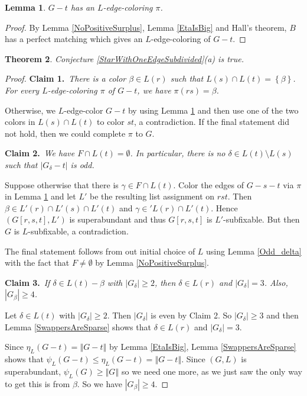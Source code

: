 \documentclass[12pt]{article}
\theoremstyle{plain}
\newtheorem{thm}{Theorem}[section]
\newtheorem{lem}[thm]{Lemma}
\theoremstyle{definition}
\theoremstyle{remark}
\newcommand{\set}[1]{\left\{ #1 \right\}}
\newcommand{\size}[1]{\left\Vert#1\right\Vert}
\newcommand{\claim}[2]{{\bf Claim #1.}~{\it #2}~~}
\begin{document}
	
	\begin{lem}\label{CanColorG-t}
		$G-t$ has an $L$-edge-coloring $\pi$.
	\end{lem}
	\begin{proof}
		By Lemma \ref{NoPositiveSurplus}, Lemma \ref{EtaIsBig} and Hall's theorem, $B$ has a perfect matching which gives an $L$-edge-coloring of $G-t$.
	\end{proof}

	\begin{thm}
		Conjecture \ref{StarWithOneEdgeSubdivided}(a) is true.
	\end{thm}
	\begin{proof}
	
		\claim{1}{There is a color $\beta \in L(r)$ such that $L(s) \cap L(t) = \set{\beta}$.  For every $L$-edge-coloring $\pi$ of $G-t$, we have $\pi(rs) = \beta$.}
		
		Otherwise, we $L$-edge-color $G-t$ by using Lemma \ref{CanColorG-t} and then use one of the two colors in $L(s) \cap L(t)$ to color $st$, a contradiction.  If the final statement did not hold, then we could complete $\pi$ to $G$.
		
		\claim{2}{We have $F \cap L(t) = \emptyset$.  In particular, there is no $\delta \in L(t) \setminus L(s)$ such that $|G_\delta - t|$ is odd.}
		
		Suppose otherwise that there is $\gamma \in F \cap L(t)$.  Color the edges of $G - s - t$ via $\pi$ in Lemma \ref{CanColorG-t} and let $L'$ be the resulting list assignment on $rst$.  Then $\beta \in L'(r) \cap L'(s) \cap L'(t)$ and $\gamma \in 'L(r) \cap L'(t)$.  Hence $(G[r,s,t], L')$ is superabundant and thus $G[r,s,t]$ is $L'$-subfixable.  But then $G$ is $L$-subfixable, a contradiction.
		
		The final statement follows from out initial choice of $L$ using Lemma \ref{Odd_delta} with the fact that $F \ne \emptyset$ by Lemma \ref{NoPositiveSurplus}.
		
		\claim{3}{If $\delta \in L(t) - \beta$ with $|G_\delta| \ge 2$, then $\delta \in L(r)$ and $|G_\delta| = 3$.  Also, $|G_\beta| \ge 4$.}
		
		Let $\delta \in L(t)$ with $|G_\delta| \ge 2$.  Then $|G_\delta|$ is even by Claim 2.  So $|G_\delta| \ge 3$ and then Lemma \ref{SwappersAreSparse} shows that $\delta \in L(r)$ and $|G_\delta| = 3$.  
		
		Since $\eta_L(G-t) = \size{G-t}$ by Lemma \ref{EtaIsBig}, Lemma \ref{SwappersAreSparse} shows that $\psi_L(G-t) \le \eta_L(G-t) = \size{G-t}$.  Since $(G,L)$ is superabundant, $\psi_L(G) \ge \size{G}$ so we need one more, as we just saw the only way to get this is from $\beta$.  So we have $|G_\beta| \ge 4$.
		

\end{proof}
\end{document}
